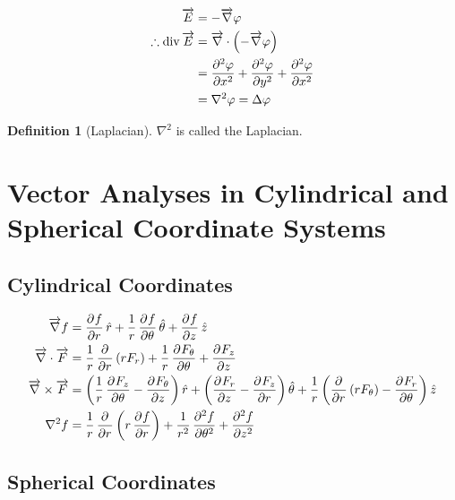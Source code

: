 \documentclass[fleqn, a4paper, 12pt, twoside]{article}
\theoremstyle{definition}
\newtheorem{definition}{Definition}
\theoremstyle{theorem}
\newcommand{\divergence}{\mathrm{div\,}}
\begin{document}
\begin{align*}
	\overrightarrow{E} &= -\overrightarrow{\nabla} \varphi\\
	\therefore \divergence \overrightarrow{E} &= \overrightarrow{\nabla} \cdot \left( -\overrightarrow{\nabla} \varphi \right)\\
	&= \dpd[2]{\varphi}{x} + \dpd[2]{\varphi}{y} + \dpd[2]{\varphi}{x}\\
	&= \nabla^2 \varphi = \Delta \varphi
\end{align*}

\begin{definition}[Laplacian]
	$\nabla^2$ is called the Laplacian.
\end{definition}

\section{Vector Analyses in Cylindrical and Spherical Coordinate Systems}

\subsection{Cylindrical Coordinates}

\begin{align*}
	\overrightarrow{\nabla} f &= \dpd{f}{r} \hat{r} + \dfrac{1}{r} \dpd{f}{\theta} \hat{\theta} + \dpd{f}{z} \hat{z}\\
	\overrightarrow{\nabla} \cdot \overrightarrow{F} &= \dfrac{1}{r} \dpd{}{r} (r F_r) + \dfrac{1}{r} \dpd{F_{\theta}}{\theta} + \dpd{F_z}{z}\\
	\overrightarrow{\nabla} \times \overrightarrow{F} &= \left( \dfrac{1}{r} \dpd{F_z}{\theta} - \dpd{F_{\theta}}{z} \right) \hat{r} + \left( \dpd{F_r}{z} - \dpd{F_z}{r} \right) \hat{\theta} + \dfrac{1}{r} \left( \dpd{}{r} (r F_{\theta}) - \dpd{F_r}{\theta} \right) \hat{z}\\
	\nabla^2 f &= \dfrac{1}{r} \dpd{}{r} \left( r \dpd{f}{r} \right) + \dfrac{1}{r^2} \dpd[2]{f}{\theta} + \dpd[2]{f}{z}
\end{align*}

\subsection{Spherical Coordinates}
\end{document}
